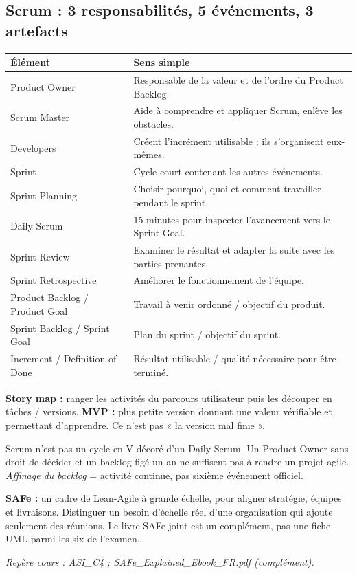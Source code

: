 \documentclass[10pt,a4paper]{article}
\newcommand{\source}[1]{\par{\footnotesize\color{bodygray}\textit{Repère cours : #1}}}
\begin{document}
\subsection{Scrum : 3 responsabilités, 5 événements, 3 artefacts}
\begin{tabularx}{\linewidth}{@{}p{33mm}X@{}}
\toprule
Élément & Sens simple \\
\midrule
Product Owner & Responsable de la valeur et de l'ordre du Product Backlog. \\
Scrum Master & Aide à comprendre et appliquer Scrum, enlève les obstacles. \\
Developers & Créent l'incrément utilisable ; ils s'organisent eux-mêmes. \\
Sprint & Cycle court contenant les autres événements. \\
Sprint Planning & Choisir pourquoi, quoi et comment travailler pendant le sprint. \\
Daily Scrum & 15 minutes pour inspecter l'avancement vers le Sprint Goal. \\
Sprint Review & Examiner le résultat et adapter la suite avec les parties prenantes. \\
Sprint Retrospective & Améliorer le fonctionnement de l'équipe. \\
Product Backlog / Product Goal & Travail à venir ordonné / objectif du produit. \\
Sprint Backlog / Sprint Goal & Plan du sprint / objectif du sprint. \\
Increment / Definition of Done & Résultat utilisable / qualité nécessaire pour être terminé. \\
\bottomrule
\end{tabularx}
\textbf{Story map :} ranger les activités du parcours utilisateur puis les découper en tâches / versions. \textbf{MVP :} plus petite version donnant une valeur vérifiable et permettant d'apprendre. Ce n'est pas « la version mal finie ».
\begin{warningbox}
Scrum n'est pas un cycle en V décoré d'un Daily Scrum. Un Product Owner sans droit de décider et un backlog figé un an ne suffisent pas à rendre un projet agile. \emph{Affinage du backlog} = activité continue, pas sixième événement officiel.
\end{warningbox}
\textbf{SAFe :} un cadre de Lean-Agile à grande échelle, pour aligner stratégie, équipes et livraisons. Distinguer un besoin d'échelle réel d'une organisation qui ajoute seulement des réunions. Le livre SAFe joint est un complément, pas une fiche UML parmi les six de l'examen.
\source{ASI\_C4 ; SAFe\_Explained\_Ebook\_FR.pdf (complément).}
\end{document}
